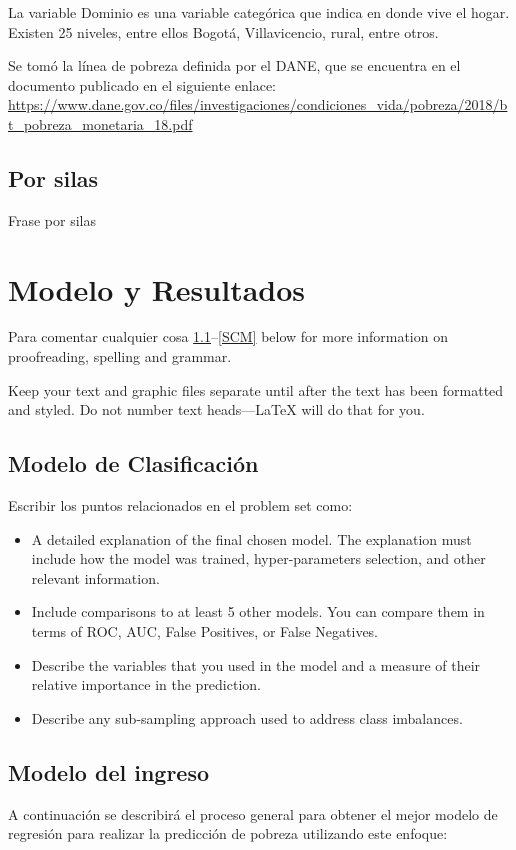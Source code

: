 \documentclass[conference, 10pt]{IEEEtran}
\begin{document}
La variable Dominio es una variable categórica que indica en donde vive el hogar. Existen 25 niveles, entre ellos Bogotá, Villavicencio, rural, entre otros. \


Se tomó la línea de pobreza definida por el DANE, que se encuentra en el documento publicado en el siguiente enlace: \url{https://www.dane.gov.co/files/investigaciones/condiciones_vida/pobreza/2018/bt_pobreza_monetaria_18.pdf}\\ 
\subsection{Por silas}

Frase por silas

\section{Modelo y Resultados}
Para comentar cualquier cosa \ref{AA}--\ref{SCM} below for more information on 
proofreading, spelling and grammar.

Keep your text and graphic files separate until after the text has been 
formatted and styled. Do not number text heads---{\LaTeX} will do that 
for you.

\subsection{Modelo de Clasificación}\label{AA}
Escribir los puntos relacionados en el problem set como:

\begin{itemize}
\item A detailed explanation of the final chosen model. The explanation must include how the model was trained, hyper-parameters selection, and other relevant information.
\item Include comparisons to at least 5 other models. You can compare them in terms of ROC, AUC, False Positives, or False Negatives.
\item Describe the variables that you used in the model and a measure of their
relative importance in the prediction. 
\item Describe any sub-sampling approach used to address class imbalances.
\end{itemize}


\subsection{Modelo del ingreso}
A continuación se describirá el proceso general para obtener el mejor modelo de regresión para realizar la predicción de pobreza utilizando este enfoque:
\end{document}
